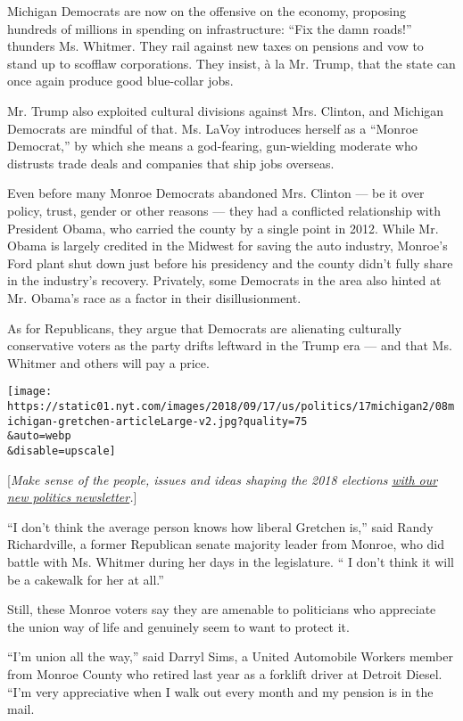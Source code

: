 Michigan Democrats are now on the offensive on the economy, proposing
hundreds of millions in spending on infrastructure: ``Fix the damn
roads!'' thunders Ms. Whitmer. They rail against new taxes on pensions
and vow to stand up to scofflaw corporations. They insist, à la Mr.
Trump, that the state can once again produce good blue-collar jobs.

Mr. Trump also exploited cultural divisions against Mrs. Clinton, and
Michigan Democrats are mindful of that. Ms. LaVoy introduces herself as
a ``Monroe Democrat,'' by which she means a god-fearing, gun-wielding
moderate who distrusts trade deals and companies that ship jobs
overseas.

Even before many Monroe Democrats abandoned Mrs. Clinton --- be it over
policy, trust, gender or other reasons --- they had a conflicted
relationship with President Obama, who carried the county by a single
point in 2012. While Mr. Obama is largely credited in the Midwest for
saving the auto industry, Monroe's Ford plant shut down just before his
presidency and the county didn't fully share in the industry's recovery.
Privately, some Democrats in the area also hinted at Mr. Obama's race as
a factor in their disillusionment.

As for Republicans, they argue that Democrats are alienating culturally
conservative voters as the party drifts leftward in the Trump era ---
and that Ms. Whitmer and others will pay a price.

\texttt{[image: https://static01.nyt.com/images/2018/09/17/us/politics/17michigan2/08michigan-gretchen-articleLarge-v2.jpg?quality=75\\\&auto=webp\\\&disable=upscale]}

{[}\emph{Make sense of the people, issues and ideas shaping the 2018
elections}
\href{https://www.nytimes.com/newsletters/politics?smid=rd?action=click\&module=Intentional\&pgtype=Article}{\emph{with
our new politics newsletter}}\emph{.}{]}

``I don't think the average person knows how liberal Gretchen is,'' said
Randy Richardville, a former Republican senate majority leader from
Monroe, who did battle with Ms. Whitmer during her days in the
legislature. `` I don't think it will be a cakewalk for her at all.''

Still, these Monroe voters say they are amenable to politicians who
appreciate the union way of life and genuinely seem to want to protect
it.

``I'm union all the way,'' said Darryl Sims, a United Automobile Workers
member from Monroe County who retired last year as a forklift driver at
Detroit Diesel. ``I'm very appreciative when I walk out every month and
my pension is in the mail.

